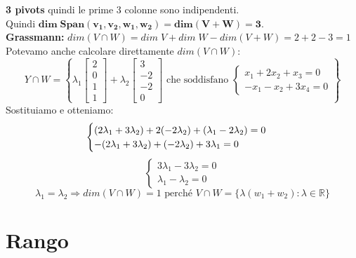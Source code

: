 \documentclass[a4paper, 12pt]{report}
\begin{document}
            \textbf{3 pivots} quindi le prime 3 colonne sono indipendenti.\\
            Quindi $\boldsymbol{dim \; Span(v_1,v_2,w_1,w_2)=dim(V+W)=3}$.\\
            \textbf{Grassmann:} $dim (V \cap W) = dim \; V + dim \; W - dim(V+W)=2+2-3=1$\\[4px]
            Potevamo anche calcolare direttamente $dim(V\cap W)$:
            $$
            Y\cap W = \left \{ \lambda_1
            \begin{bmatrix}
                2\\
                0\\
                1\\
                1
            \end{bmatrix}    
            +\lambda_2
            \begin{bmatrix}
                3\\
                -2\\
                -2\\
                0
            \end{bmatrix}
            \text{ che soddisfano }
            \begin{cases}
                x_1+2x_2+x_3=0\\
                -x_1-x_2+3x_4=0
            \end{cases}
            \right \}
            $$
            Sostituiamo e otteniamo:
            $$
            \begin{cases}
                (2\lambda_1+3\lambda_2)+2(-2\lambda_2)+(\lambda_1-2\lambda_2)=0\\
                -(2\lambda_1+3\lambda_2)+(-2\lambda_2)+3\lambda_1=0
            \end{cases}\\
            $$
            $$
            \begin{cases}
                3\lambda_1-3\lambda_2=0\\
                \lambda_1-\lambda_2=0
            \end{cases}
            $$
            $$
            \lambda_1=\lambda_2 \Rightarrow dim (V \cap W)=1 \text{ perché } V\cap W=\{\lambda(w_1+w_2):\lambda \in \mathbb{R}\}
            $$
        \section{Rango}
\end{document}
